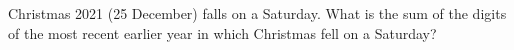 Christmas 2021 (25 December) falls on a Saturday. What is the sum of the digits of the most recent earlier year in which Christmas fell on a Saturday?
